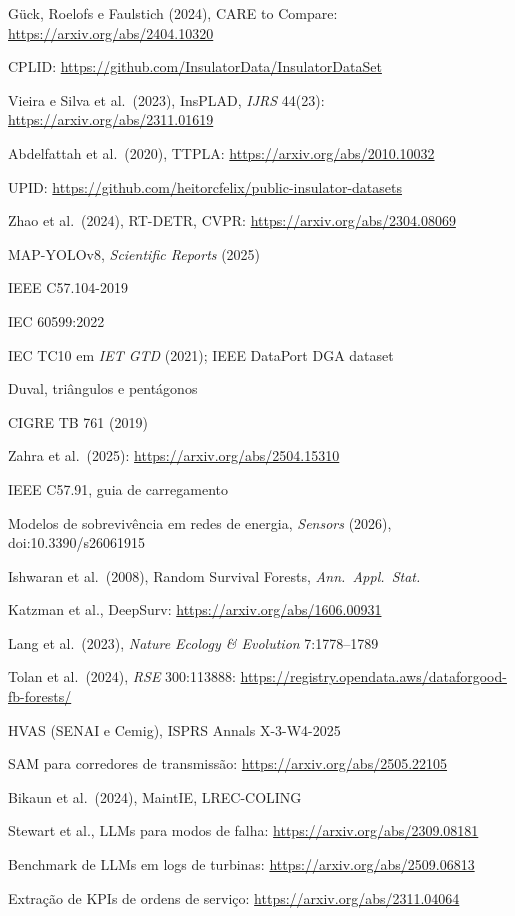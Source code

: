 {\begin{enumerate}[label={[\arabic*]},leftmargin=2.2em,itemsep=1pt]
\item Gück, Roelofs e Faulstich (2024), CARE to Compare: \url{https://arxiv.org/abs/2404.10320}
\item CPLID: \url{https://github.com/InsulatorData/InsulatorDataSet}
\item Vieira e Silva et al.\ (2023), InsPLAD, \emph{IJRS} 44(23): \url{https://arxiv.org/abs/2311.01619}
\item Abdelfattah et al.\ (2020), TTPLA: \url{https://arxiv.org/abs/2010.10032}
\item UPID: \url{https://github.com/heitorcfelix/public-insulator-datasets}
\item Zhao et al.\ (2024), RT-DETR, CVPR: \url{https://arxiv.org/abs/2304.08069}
\item MAP-YOLOv8, \emph{Scientific Reports} (2025)
\item IEEE C57.104-2019
\item IEC 60599:2022
\item IEC TC10 em \emph{IET GTD} (2021); IEEE DataPort DGA dataset
\item Duval, triângulos e pentágonos
\item CIGRE TB 761 (2019)
\item Zahra et al.\ (2025): \url{https://arxiv.org/abs/2504.15310}
\item IEEE C57.91, guia de carregamento
\item Modelos de sobrevivência em redes de energia, \emph{Sensors} (2026), doi:10.3390/s26061915
\item Ishwaran et al.\ (2008), Random Survival Forests, \emph{Ann.\ Appl.\ Stat.}
\item Katzman et al., DeepSurv: \url{https://arxiv.org/abs/1606.00931}
\item Lang et al.\ (2023), \emph{Nature Ecology \& Evolution} 7:1778--1789
\item Tolan et al.\ (2024), \emph{RSE} 300:113888: \url{https://registry.opendata.aws/dataforgood-fb-forests/}
\item HVAS (SENAI e Cemig), ISPRS Annals X-3-W4-2025
\item SAM para corredores de transmissão: \url{https://arxiv.org/abs/2505.22105}
\item Bikaun et al.\ (2024), MaintIE, LREC-COLING
\item Stewart et al., LLMs para modos de falha: \url{https://arxiv.org/abs/2309.08181}
\item Benchmark de LLMs em logs de turbinas: \url{https://arxiv.org/abs/2509.06813}
\item Extração de KPIs de ordens de serviço: \url{https://arxiv.org/abs/2311.04064}

\end{enumerate}}
